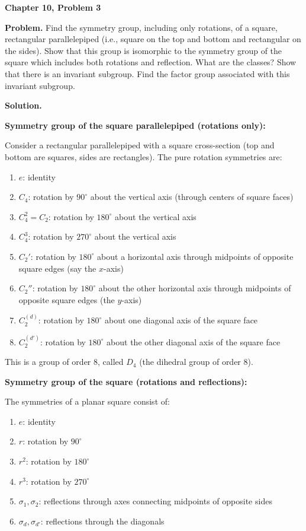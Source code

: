 \documentclass[12pt]{article}
\begin{document}
\begin{center}
{\Large\bfseries Chapter 10, Problem 3}
\end{center}

\noindent\textbf{Problem.} Find the symmetry group, including only rotations, of a square, rectangular parallelepiped (i.e., square on the top and bottom and rectangular on the sides). Show that this group is isomorphic to the symmetry group of the square which includes both rotations and reflection. What are the classes? Show that there is an invariant subgroup. Find the factor group associated with this invariant subgroup.

\bigskip
\noindent\textbf{Solution.}

\noindent\textbf{Symmetry group of the square parallelepiped (rotations only):}

Consider a rectangular parallelepiped with a square cross-section (top and bottom are squares, sides are rectangles). The pure rotation symmetries are:

\begin{enumerate}
\item $e$: identity
\item $C_4$: rotation by $90^\circ$ about the vertical axis (through centers of square faces)
\item $C_4^2 = C_2$: rotation by $180^\circ$ about the vertical axis
\item $C_4^3$: rotation by $270^\circ$ about the vertical axis
\item $C_2'$: rotation by $180^\circ$ about a horizontal axis through midpoints of opposite square edges (say the $x$-axis)
\item $C_2''$: rotation by $180^\circ$ about the other horizontal axis through midpoints of opposite square edges (the $y$-axis)
\item $C_2^{(d)}$: rotation by $180^\circ$ about one diagonal axis of the square face
\item $C_2^{(d')}$: rotation by $180^\circ$ about the other diagonal axis of the square face
\end{enumerate}

This is a group of order 8, called $D_4$ (the dihedral group of order 8).

\medskip
\noindent\textbf{Symmetry group of the square (rotations and reflections):}

The symmetries of a planar square consist of:
\begin{enumerate}
\item $e$: identity
\item $r$: rotation by $90^\circ$
\item $r^2$: rotation by $180^\circ$
\item $r^3$: rotation by $270^\circ$
\item $\sigma_1, \sigma_2$: reflections through axes connecting midpoints of opposite sides
\item $\sigma_d, \sigma_{d'}$: reflections through the diagonals
\end{enumerate}
\end{document}
